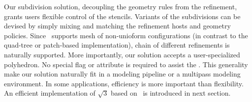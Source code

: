 Our subdivision solution, decoupling the geometry rules from the
refinement, grants users flexible control of the stencils.
Variants of the subdivisions can be devised by simply mixing
and matching the refinement hosts and geometry policies. Since
\cgalpoly\ supports mesh of non-unioform configurations 
(in contrast to the quad-tree or patch-based 
implementation), chain of different refinements
is naturally supported.
More importantly, our solution accepts a user-specialized 
polyhedron. No special flag or attribute is required 
to assist the \tr . This generality make our solution 
naturally fit in a modeling pipeline or a multipass modeling 
environment. In some applications, efficiency is more
important than flexibility. An efficient implementation
of $\sqrt{3}$ based on \cgalpoly\ is introduced in next section.


 
